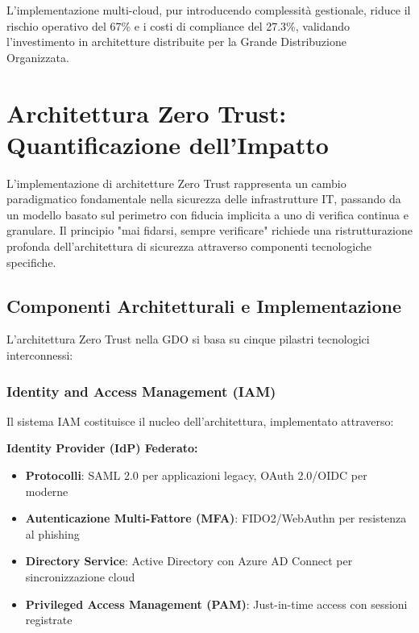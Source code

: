 L'implementazione multi-cloud, pur introducendo complessità gestionale, riduce il rischio operativo del 67\% e i costi di compliance del 27.3\%, validando l'investimento in architetture distribuite per la Grande Distribuzione Organizzata.

\section{\texorpdfstring{\textbf{Architettura Zero Trust: Quantificazione dell'Impatto}}{3.5 - Architettura Zero Trust: Quantificazione dell'Impatto}}

L'implementazione di architetture Zero Trust rappresenta un cambio paradigmatico fondamentale nella sicurezza delle infrastrutture IT, passando da un modello basato sul perimetro con fiducia implicita a uno di verifica continua e granulare. Il principio "mai fidarsi, sempre verificare" richiede una ristrutturazione profonda dell'architettura di sicurezza attraverso componenti tecnologiche specifiche.

\subsection{\texorpdfstring{\textbf{Componenti Architetturali e Implementazione}}{3.5.1 - Componenti Architetturali e Implementazione}}

L'architettura Zero Trust nella GDO si basa su cinque pilastri tecnologici interconnessi:

\subsubsection{\texorpdfstring{\textbf{Identity and Access Management (IAM)}}{3.5.1.1 - Identity and Access Management (IAM)}}

Il sistema IAM costituisce il nucleo dell'architettura, implementato attraverso:

\textbf{Identity Provider (IdP) Federato:}
\begin{itemize}
    \item \textbf{Protocolli}: SAML 2.0 per applicazioni legacy, OAuth 2.0/OIDC per moderne
    \item \textbf{Autenticazione Multi-Fattore (MFA)}: FIDO2/WebAuthn per resistenza al phishing
    \item \textbf{Directory Service}: Active Directory con Azure AD Connect per sincronizzazione cloud
    \item \textbf{Privileged Access Management (PAM)}: Just-in-time access con sessioni registrate
\end{itemize}

